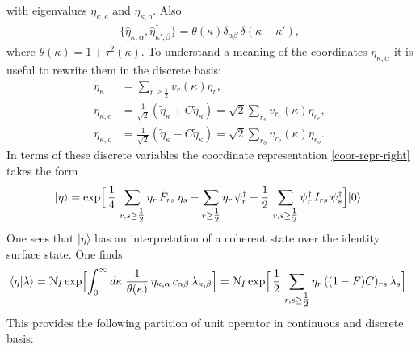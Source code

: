 \documentclass[a4paper,12pt]{article}
\newcommand{\Nc}{\mathcal{N}}
\begin{document}
with eigenvalues $\eta_{\kappa,e}$ and $\eta_{\kappa,o}$. Also
\begin{gather}
\{\hat{\eta}_{\kappa,\alpha},\hat{\eta}^{\dag}_{\kappa',\beta}\}
=\theta(\kappa)\delta_{\alpha\beta}\,\delta(\kappa-\kappa'),
\end{gather}
where $\theta(\kappa)=1+\tau^{2}(\kappa)$.
To understand a meaning of the coordinates $\eta_{\kappa,\alpha}$
it is useful to rewrite them in the discrete basis:
\begin{subequations}
\begin{align}
\tilde{\eta}_{\kappa}&=\sum_{r\geq\tfrac12}v_{r}(\kappa)\eta_{r},\\
\eta_{\kappa,e}&=\frac{1}{\sqrt{2}}(\tilde{\eta}_{\kappa}+C\tilde{\eta}_{\kappa})
=\sqrt{2}\sum_{r_e}v_{r_e}(\kappa)\eta_{r_e},\\
\eta_{\kappa,o}&=\frac{1}{\sqrt{2}}(\tilde{\eta}_{\kappa}-C\tilde{\eta}_{\kappa})
=\sqrt{2}\sum_{r_o}v_{r_o}(\kappa)\eta_{r_o}.
\end{align}
\end{subequations}
In terms of these discrete variables the coordinate representation
\eqref{coor-repr-right} takes the form
\begin{gather}
|\eta\rangle=\exp\Bigl[
\,\frac14\,\sum_{r,s\geq\tfrac12}\eta_r\,\tilde{F}_{rs}\,\eta_s
-\sum_{r\geq\tfrac12}\eta_r\,\psi^{\dag}_r
+\frac12\,\sum_{r,s\geq\tfrac12}\psi^{\dag}_r\,I_{rs}\,\psi^{\dag}_s
\Bigr]|0\rangle.
\label{coor-repr-right-discr}
\end{gather}
One sees that $|\eta\rangle$ has an interpretation
of a coherent state over the identity surface state.
One finds
\begin{gather}
\langle \eta|\lambda\rangle
=\Nc_{I}\exp\Bigl[
\int_{0}^{\infty}d\kappa\;
\frac{1}{\theta(\kappa)}\,\eta_{\kappa,\alpha}\,
c_{\alpha\beta}\,\lambda_{\kappa,\beta}\Bigr]
=\Nc_{I}\exp\Bigl[
\,\frac12\,\sum_{r,s\geq\tfrac12}\eta_{r}\,((1-F)C)_{rs}\,\lambda_s\Bigr].
\label{norm-equation}
\end{gather}
This provides the following
partition of unit operator in continuous and discrete basis:
\end{document}
